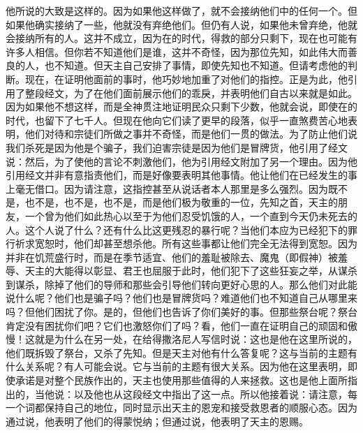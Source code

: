 他所说的大致是这样的。因为如果他这样做了，就不会接纳他们中的任何一个。但如果他确实接纳了一些，他就没有弃绝他们。但仍有人说，如果他未曾弃绝，他就会接纳所有的人。这并不成立，因为在的时代，得救的部分只剩下，现在也可能有许多人相信。但你若不知道他们是谁，这并不奇怪，因为那位先知，如此伟大而善良的人，也不知道。但天主自己安排了事情，即使先知也不知道。但请考虑他的判断。现在，在证明他面前的事时，他巧妙地加重了对他们的指控。正是为此，他引用了整段经文，为了在他们面前展示他们的乖戾，并表明他们自古以来就是如此。因为如果他不想这样，而是全神贯注地证明民众只剩下少数，他就会说，即使在的时代，也留下了七千人。但现在他向它们读了更早的段落，似乎一直煞费苦心地表明，他们对待和宗徒们所做之事并不奇怪，而是他们一贯的做法。为了防止他们说我们杀死是因为他是个骗子，我们迫害宗徒是因为他们是冒牌货，他引用了经文说：然后，为了使他的言论不刺激他们，他为引用经文附加了另一个理由。因为他引用经文并非有意指责他们，而是好像要表明其他事情。他让他们在已经发生的事上毫无借口。因为请注意，这指控甚至从说话者本人那里是多么强烈。因为既不是，也不是，也不是，也不是，而是他们极为敬重的一位，先知之首，天主的朋友，一个曾为他们如此热心以至于为他们忍受饥饿的人，一个直到今天仍未死去的人。这个人说了什么？还有什么比这更残忍的暴行呢？当他们本应为已经犯下的罪行祈求宽恕时，他们却甚至想杀他。所有这些事都让他们完全无法得到宽恕。因为并非在饥荒盛行时，而是在季节适宜、他们的羞耻被除去、魔鬼（即假神）被羞辱、天主的大能得以彰显、君王也屈服于此时，他们犯下了这些狂妄之举，从谋杀到谋杀，除掉了他们的导师和那些会引导他们转向更好心思的人。那么他们对此能说什么呢？他们也是骗子吗？他们也是冒牌货吗？难道他们也不知道自己从哪里来吗？但他们困扰了你。是的，但他们也告诉了你们美好的事。但那些祭台呢？祭台肯定没有困扰你们吧？它们也激怒你们了吗？看，他们一直在证明自己的顽固和傲慢！这就是为什么在另一处，在给得撒洛尼人写信时说：这也是他在这里所说的，他们既拆毁了祭台，又杀了先知。但是天主对他有什么答复呢？这与当前的主题有什么关系呢？有人可能会说。它与当前的主题有很大关系。因为他在这里表明，即使承诺是对整个民族作出的，天主也使用那些值得的人来拯救。这也是他上面所指出的，当他说：以及他也从这段经文中指出了这一点。所以他接着说：请注意，每一个词都保持自己的地位，同时显示出天主的恩宠和接受救恩者的顺服心态。因为通过说，他表明了他们的得蒙悦纳；但通过说，他表明了天主的恩赐。\par

